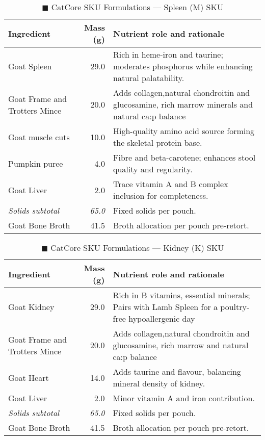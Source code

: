 \begin{table}[htbp]
\centering
\caption{\textcolor{darkbrown}{$\blacksquare$} CatCore SKU Formulations --- Spleen (M) SKU}
\label{tab:lamb_sku_3col}
\begin{adjustbox}{max width=\textwidth}
\begin{tabular}{@{}l r p{8.0cm}@{}}
\toprule
\textbf{Ingredient} & \textbf{Mass (g)} & \textbf{Nutrient role and rationale} \\
\midrule
Goat Spleen & 29.0 & Rich in heme-iron and taurine; moderates phosphorus while enhancing natural palatability. \\[3pt]
Goat Frame and Trotters Mince & 20.0 & Adds collagen,natural chondroitin and glucosamine, rich marrow minerals and natural ca:p balance \\[3pt]
Goat muscle cuts & 10.0 & High-quality amino acid source forming the skeletal protein base. \\[3pt]
Pumpkin puree & 4.0 & Fibre and beta-carotene; enhances stool quality and regularity. \\[3pt]
Goat Liver & 2.0 & Trace vitamin A and B complex inclusion for completeness. \\[3pt]
\textit{Solids subtotal} & \textit{65.0} & Fixed solids per pouch. \\[3pt]
Goat Bone Broth & 41.5 & Broth allocation per pouch pre-retort. \\[3pt]
\bottomrule
\end{tabular}
\end{adjustbox}
\end{table}


\begin{table}[htbp]
\centering
\caption{\textcolor{darkbrown}{$\blacksquare$} CatCore SKU Formulations --- Kidney (K) SKU}
\label{tab:kidney_sku_3col}
\begin{adjustbox}{max width=\textwidth}
\begin{tabular}{@{}l r p{8.0cm}@{}}
\toprule
\textbf{Ingredient} & \textbf{Mass (g)} & \textbf{Nutrient role and rationale} \\
\midrule
Goat Kidney & 29.0 & Rich in B vitamins, essential minerals; Pairs with Lamb Spleen for a poultry-free hypoallergenic day \\[3pt]
Goat Frame and Trotters Mince & 20.0 & Adds collagen,natural chondroitin and glucosamine, rich marrow and natural ca:p balance \\[3pt]
Goat Heart & 14.0 & Adds taurine and flavour, balancing mineral density of kidney. \\[3pt]
Goat Liver & 2.0 & Minor vitamin A and iron contribution. \\[3pt]
\textit{Solids subtotal} & \textit{65.0} & Fixed solids per pouch. \\[3pt]
Goat Bone Broth & 41.5 & Broth allocation per pouch pre-retort. \\[3pt]
\bottomrule
\end{tabular}
\end{adjustbox}
\end{table}
\vspace{1em}

